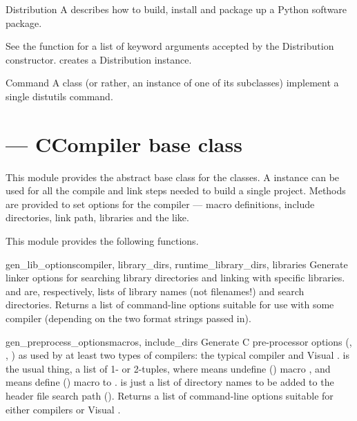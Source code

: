 \documentclass{manual}
\begin{document}
\begin{classdesc*}{Distribution}
A  describes how to build, install and package up a
Python software package. 

See the  function for a list of keyword arguments accepted 
by the Distribution constructor.  creates a Distribution
instance.
\end{classdesc*}

\begin{classdesc*}{Command}
A  class (or rather, an instance of one of its subclasses)
implement a single distutils command.
\end{classdesc*}


\section{ --- CCompiler base class}

This module provides the abstract base class for the  
classes.  A  instance can be used for all the compile 
and link steps needed to build a single project. Methods are provided to 
set options for the compiler --- macro definitions, include directories, 
link path, libraries and the like.

This module provides the following functions.

\begin{funcdesc}{gen_lib_options}{compiler, library_dirs, runtime_library_dirs, libraries}
Generate linker options for searching library directories and
linking with specific libraries.   and  are,
respectively, lists of library names (not filenames!) and search
directories.  Returns a list of command-line options suitable for use
with some compiler (depending on the two format strings passed in).
\end{funcdesc}
    
\begin{funcdesc}{gen_preprocess_options}{macros, include_dirs}
Generate C pre-processor options (, ,
) as used by at least
two types of compilers: the typical \UNIX{} compiler and Visual \Cpp.
 is the usual thing, a list of 1- or 2-tuples, where
 means undefine () macro ,
and  means define ()
macro  to .   is just a list of
directory names to be added to the header file search path ().
Returns a list of command-line options suitable for either \UNIX{} compilers
or Visual \Cpp.
\end{funcdesc}
\end{document}
